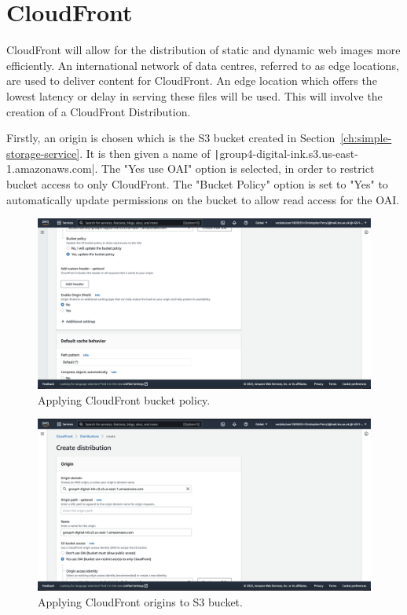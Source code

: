 \chapter{CloudFront}\label{ch:cloudfront}

CloudFront will allow for the distribution of static and dynamic web images more efficiently.
An international network of data centres, referred to as edge locations, are used to deliver content for CloudFront.
An edge location which offers the lowest latency or delay in serving these files will be used.
This will involve the creation of a CloudFront Distribution.

Firstly, an origin is chosen which is the S3 bucket created in Section~\ref{ch:simple-storage-service}.
It is then given a name of \texttt|group4-digital-ink.s3.us-east-1.amazonaws.com|.
The "Yes use OAI" option is selected, in order to restrict bucket access to only CloudFront.
The "Bucket Policy" option is set to "Yes" to automatically update permissions on the bucket to allow read access for
the OAI.

\begin{figure}[!htbp]
    \centering
    \includegraphics[width=\textwidth]{resources/cloudfront/cloudfront-bucket-policy}
    \caption{Applying CloudFront bucket policy.}
    \label{fig:cloudfront-bucket-policy}
\end{figure}

\begin{figure}[!htbp]
    \centering
    \includegraphics[width=\textwidth]{resources/cloudfront/cloudfront-origin}
    \caption{Applying CloudFront origins to S3 bucket.}
    \label{fig:cloudfront-origins}
\end{figure}

